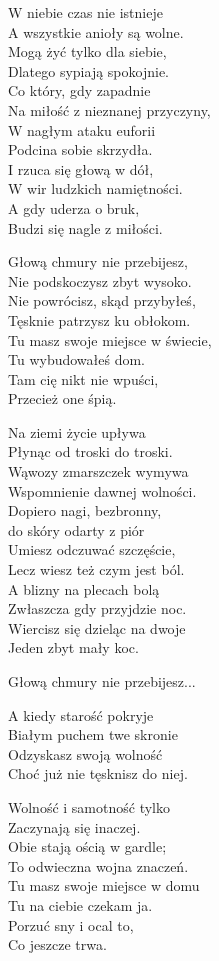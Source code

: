 \begin{text}
    \begin{footTwelve}
W niebie czas nie istnieje\\
A wszystkie anioły są wolne.\\
Mogą żyć tylko dla siebie,\\
Dlatego sypiają spokojnie.\\
Co który, gdy zapadnie\\
Na miłość z nieznanej przyczyny,\\
W nagłym ataku euforii\\
Podcina sobie skrzydła.\\
I rzuca się głową w dół,\\
W wir ludzkich namiętności.\\
A gdy uderza o bruk,\\
Budzi się nagle z miłości.

\vin Głową chmury nie przebijesz,\\
\vin Nie podskoczysz zbyt wysoko.\\
\vin Nie powrócisz, skąd przybyłeś,\\
\vin Tęsknie patrzysz ku obłokom.\\
\vin Tu masz swoje miejsce w świecie,\\
\vin Tu wybudowałeś dom.\\
\vin Tam cię nikt nie wpuści,\\
\vin Przecież one śpią.

Na ziemi życie upływa\\
Płynąc od troski do troski.\\
Wąwozy zmarszczek wymywa\\
Wspomnienie dawnej wolności.\\
Dopiero nagi, bezbronny,\\
do skóry odarty z piór\\
Umiesz odczuwać szczęście,\\
Lecz wiesz też czym jest ból.\\
A blizny na plecach bolą\\
Zwłaszcza gdy przyjdzie noc.\\
Wiercisz się dzieląc na dwoje\\
Jeden zbyt mały koc.

\vin Głową chmury nie przebijesz...

A kiedy starość pokryje\\
Białym puchem twe skronie\\
Odzyskasz swoją wolność\\
Choć już nie tęsknisz do niej.

\vin Wolność i samotność tylko\\
\vin Zaczynają się inaczej.\\
\vin Obie stają ością w gardle;\\
\vin To odwieczna wojna znaczeń.\\
\vin Tu masz swoje miejsce w domu\\
\vin Tu na ciebie czekam ja.\\
\vin Porzuć sny i ocal to,\\
\vin Co jeszcze trwa.
\end{footTwelve}
\end{text}
